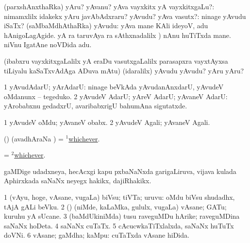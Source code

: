 \bentry
{} 
\gl{\sanA}
\expl{}
\bmng
\bnum
{} (parxshAnxthaRka) 
\banum
{} yAru? yAvanu? yAva vayxkitx yA vayxkitxgaLu?:  nimamxlilx idakekx yAru javAbAdxraru? 
 yAvudu? yAva vasutx?:  ninage yAvudu iSaTx? 
\eanum
\numie
{} (saMbaMdhAthaRka) 
\banum
{} yAvudu:  yAva mane KAli ideyoV, adu hAnigoLagAgide. 
  yA  ra taruvAya  ra sAthxnadalilx \parx)  nAnu huTiTxda mane.  niVnu IgatAne noVDida adu. 
\eanum
\numie
\enum
\emng

\noindent
\gl{\pagu}
\expl{}
\bmng
  (ibabxru vayxkitxgaLalilx yA eraDu vasutxgaLalilx parasapxra vayxtAyxsa tiLiyalu kaSaTxvAdAga ADuva mAtu) (idaralilx) yAvudu yAvudu? yAru yAru? 
\emng
\eentry

\bentry 
{} 
\gl{\gu}
\expl{}
\bmng
\bnum
\num{1} yAvudAdarU; yArAdarU:  ninage beVkAda yAvudanAnxdarU, yAvudeV oMdanunx -- tegeduko. 
\num{2} yAvudeV AdarU; yAreV AdarU; yAvaneV AdarU:  yArobabxnu gedadxrU, avaribabxrigU bahumAna sigutatxde. 
\enum
\emng
\eentry

\bentry 
{} 
\gl{\sanA}
\expl{}
\bmng
\bnum
\num{1} yAvudeV oMdu; yAvaneV obabx. 
\num{2} yAvudeV Agali; yAvaneV Agali. 
\enum
\emng
\eentry

\bentry
{} 
\gl{\gu}
\expl{}
\bmng
(\pArxparx) (avadhAraNa \parx) = \hyperlink{whichever(1)}{$^1$whichever}. 
\emng
\eentry

\bentry
{} 
\gl{\sanA}
\expl{}
\bmng
= \hyperlink{whichever(2)}{$^2$whichever}. 
\emng
\eentry

\bentry
{} 
\gl{\nA}
\expl{}
\bmng
gaMDige udadxneya, hecAcxgi kapu pxbaNaNxda garigaLiruva, vijava  kulada Aphirxkada saNaNx neyegx hakikx, dajiRhakikx. 
\emng
\eentry

\bentry
{} 
\gl{\nA}
\expl{}
\bmng
\bnum
\num{1} (vAyu, hoge, vAsane, \mo vugaLa) biVsu; tiVTa; uruvu:  oMdu biVsu shudadhx, tAjA gALi beVku. 
\num{2} (\rUpa) (niMde, kaLaMka, gululx, \mo vugaLa) vAsane; GATu; kuruhu yA sUcane. 
\num{3} (baMdUkiniMda) tusu raveguMDu hArike; raveguMDina saNaNx hoDeta. 
\num{4} saNaNx cuTaTx. 
\num{5} cAcucwkaTiTxlalxda, saNaNx huTuTx doVNi. 
\num{6} vAsane; gaMdha; kaMpu:  cuTaTxda vAsane hiDida. 
\enum
\emng
\eentry

